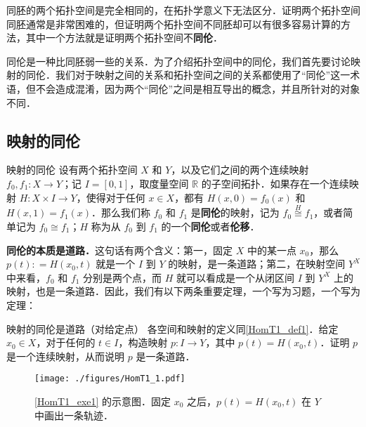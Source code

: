
同胚的两个拓扑空间是完全相同的，在拓扑学意义下无法区分．证明两个拓扑空间同胚通常是非常困难的，但证明两个拓扑空间不同胚却可以有很多容易计算的方法，其中一个方法就是证明两个拓扑空间不\textbf{同伦}．

同伦是一种比同胚弱一些的关系．为了介绍拓扑空间中的同伦，我们首先要讨论映射的同伦．我们对于映射之间的关系和拓扑空间之间的关系都使用了“同伦”这一术语，但不会造成混淆，因为两个“同伦”之间是相互导出的概念，并且所针对的对象不同．

\subsection{映射的同伦}

\begin{definition}{映射的同伦}\label{HomT1_def1}
设有两个拓扑空间 $X$ 和 $Y$，以及它们之间的两个连续映射 $f_0, f_1:X\rightarrow Y$；记 $I=[0, 1]$，取度量空间 $\mathbb{R}$ 的子空间拓扑．如果存在一个连续映射 $H: X\times I\rightarrow Y$，使得对于任何 $x\in X$，都有 $H(x, 0)=f_0(x)$ 和 $H(x, 1)=f_1(x)$．那么我们称 $f_0$ 和 $f_1$ 是\textbf{同伦}的映射，记为 $f_0\overset{H}{\cong} f_1$，或者简单记为 $f_0\cong f_1$；$H$ 称为从 $f_0$ 到 $f_1$ 的一个\textbf{同伦}或者\textbf{伦移}．

\end{definition}

\textbf{同伦的本质是道路．}这句话有两个含义：第一，固定 $X$ 中的某一点 $x_0$，那么 $p(t): = H(x_0, t)$ 就是一个 $I$ 到 $Y$ 的映射，是一条道路；第二，在映射空间 $Y^X$ 中来看，$f_0$ 和 $f_1$ 分别是两个点，而 $H$ 就可以看成是一个从闭区间 $I$ 到 $Y^X$ 上的映射，也是一条道路．因此，我们有以下两条重要定理，一个写为习题，一个写为定理：

\begin{exercise}{映射的同伦是道路（对给定点）}\label{HomT1_exe1}
各空间和映射的定义同\autoref{HomT1_def1}．给定 $x_0\in X$，对于任何的 $t\in I$，构造映射 $p:I\rightarrow Y$，其中 $p(t)=H(x_0, t)$．证明 $p$ 是一个连续映射，从而说明 $p$ 是一条道路．
\end{exercise}

\begin{figure}[ht]
\centering
\texttt{[image: ./figures/HomT1\_1.pdf]}
\caption{\autoref{HomT1_exe1} 的示意图．固定 $x_0$ 之后，$p(t)=H(x_0, t)$ 在 $Y$ 中画出一条轨迹．} \label{HomT1_fig1}
\end{figure}



